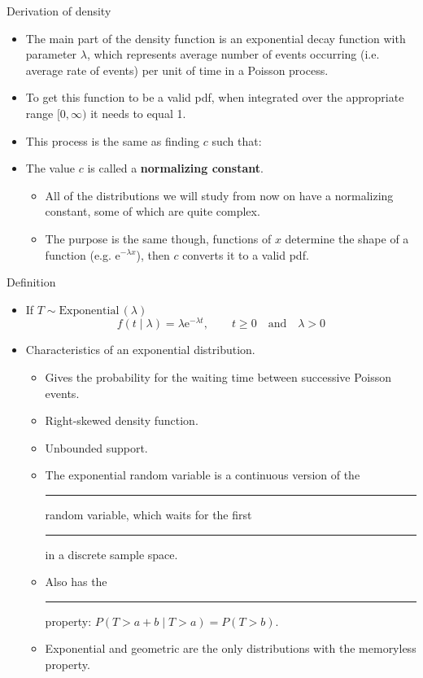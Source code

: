 \documentclass{article}
\newcommand{\blankul}[1]{\rule[-1.5mm]{#1}{0.15mm}}	%
\newcommand{\follow}[1]{\sim \text{#1}\,}		%
\newcommand{\e}{\mathrm{e}}		%
\begin{document}
\newpage

Derivation of density\bigskip
\begin{itemize}
    \item The main part of the density function is an exponential decay function with parameter $\lambda$, which represents average number of events occurring (i.e. average rate of events) per unit of time in a Poisson process.\smallskip
    \item To get this function to be a valid pdf, when integrated over the appropriate range $[0, \infty)$ it needs to equal 1.\vspace{130pt}
    \item[] This process is the same as finding $c$ such that: \vspace{20pt}
    \item The value $c$ is called a \textbf{normalizing constant}.
    \begin{itemize}
        \item All of the distributions we will study from now on have a normalizing constant, some of which are quite complex.
        \item The purpose is the same though, functions of $x$ determine the shape of a function (e.g. $\e^{-\lambda x}$), then $c$ converts it to a valid pdf.
    \end{itemize}
\end{itemize}\bigskip

Definition\bigskip
\begin{itemize}
    \item If $T \follow{Exponential}(\lambda)$
    \[f(t \mid \lambda) = \lambda \e^{-\lambda t}, \quad\quad t \ge 0 \quad \text{and}\quad \lambda > 0\]
    \item Characteristics of an exponential distribution.
    \begin{itemize}
        \item Gives the probability for the waiting time between successive Poisson events.
        \item Right-skewed density function.
        \item Unbounded support.
        \item The exponential random variable is a continuous version of the \blankul{3cm} random variable, which waits for the first \blankul{2cm} in a discrete sample space.
        \item Also has the \blankul{3cm} property: $P(T > a + b \mid T > a) = P(T > b)$.
        \item[] Exponential and geometric are the only distributions with the memoryless property.
    \end{itemize}
\end{itemize}\bigskip
\end{document}
